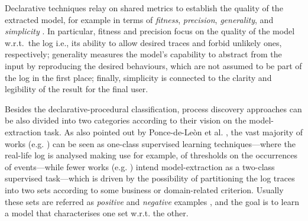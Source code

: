 Declarative techniques relay on shared metrics to establish the quality of the extracted model, for example in terms of \emph{fitness}, \emph{precision}, \emph{generality}, and \emph{simplicity} \cite{2015-Adriansyah,2014-Broucke,2018-Ponce}. In particular, fitness and precision focus on the quality of the model w.r.t.~the log i.e., its ability to allow desired traces and forbid unlikely ones, respectively; generality measures the model's capability to abstract from the input by reproducing the desired behaviours, which are not assumed to be part of the log in the first place; finally, simplicity is connected to the clarity and legibility of the result for the final user. 

Besides the declarative-procedural classification, process discovery approaches can be also divided into two categories according to their vision on the model-extraction task. 
As also pointed out by Ponce-de-Le\`on et al. \cite{2018-Ponce}, the vast majority of works (e.g. \cite{2004-Aalst,2003-Weijters,2007-Gunther,2010-Aalst}) can be seen as one-class supervised learning techniques---where the real-life log is analysed making use for example, of thresholds on the occurrences of events---while fewer works (e.g. \cite{2006-Maruster,2009-Goedertier,2009-Chesani}) intend model-extraction as a two-class supervised task---which is driven by the possibility of partitioning the log traces into two sets according to some business or domain-related criterion. Usually these sets are referred as \emph{positive} and \emph{negative} examples \cite{2018-Ponce}, and the goal is to learn a model that characterises one set w.r.t. the other. 
%


